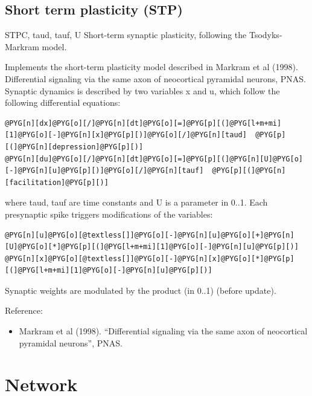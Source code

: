 \documentclass[letterpaper,10pt,english]{manual}
\begin{document}
\subsection{Short term plasticity (STP)}

\hypertarget{brian.STP}{}\begin{classdesc}{STP}{C, taud, tauf, U}
Short-term synaptic plasticity, following the Tsodyks-Markram model.

Implements the short-term plasticity model described in Markram et al (1998).
Differential signaling via the same axon of
neocortical pyramidal neurons, PNAS.
Synaptic dynamics is described by two variables x and u, which follow
the following differential equations:

\begin{Verbatim}[commandchars=@\[\]]
@PYG[n][dx]@PYG[o][/]@PYG[n][dt]@PYG[o][=]@PYG[p][(]@PYG[l+m+mi][1]@PYG[o][-]@PYG[n][x]@PYG[p][)]@PYG[o][/]@PYG[n][taud]  @PYG[p][(]@PYG[n][depression]@PYG[p][)]
@PYG[n][du]@PYG[o][/]@PYG[n][dt]@PYG[o][=]@PYG[p][(]@PYG[n][U]@PYG[o][-]@PYG[n][u]@PYG[p][)]@PYG[o][/]@PYG[n][tauf]  @PYG[p][(]@PYG[n][facilitation]@PYG[p][)]
\end{Verbatim}

where taud, tauf are time constants and U is a parameter in 0..1. Each presynaptic
spike triggers modifications of the variables:

\begin{Verbatim}[commandchars=@\[\]]
@PYG[n][u]@PYG[o][@textless[]]@PYG[o][-]@PYG[n][u]@PYG[o][+]@PYG[n][U]@PYG[o][*]@PYG[p][(]@PYG[l+m+mi][1]@PYG[o][-]@PYG[n][u]@PYG[p][)]
@PYG[n][x]@PYG[o][@textless[]]@PYG[o][-]@PYG[n][x]@PYG[o][*]@PYG[p][(]@PYG[l+m+mi][1]@PYG[o][-]@PYG[n][u]@PYG[p][)]
\end{Verbatim}

Synaptic weights are modulated by the product  (in 0..1) (before update).

Reference:
\begin{itemize}
\item {} 
Markram et al (1998). ``Differential signaling via the same axon of
neocortical pyramidal neurons'', PNAS.

\end{itemize}
\end{classdesc}

\resetcurrentobjects
\hypertarget{--doc-reference-network}{}

\section{Network}
\end{document}
